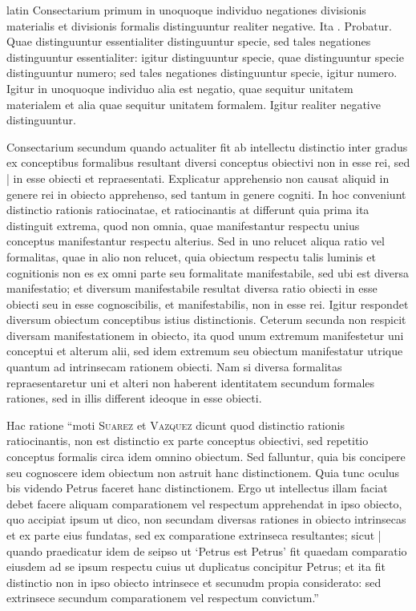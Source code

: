 \begin{otherlanguage*}{latin}
\pstart
 Consectarium primum in unoquoque individuo negationes divisionis materialis et divisionis formalis distinguuntur realiter negative. Ita . Probatur. Quae distinguuntur essentialiter distinguuntur specie, sed tales negationes distinguuntur essentialiter: igitur distinguuntur specie, quae distinguuntur specie distinguuntur numero; sed tales negationes distinguuntur specie, igitur numero. Igitur in unoquoque individuo alia est negatio, quae sequitur unitatem materialem et alia quae sequitur unitatem formalem. Igitur realiter negative distinguuntur. 
\pend

\pstart
 Consectarium secundum quando actualiter fit ab intellectu distinctio inter gradus ex conceptibus formalibus resultant diversi conceptus obiectivi non in esse rei, sed \textnormal{|}  in esse obiecti et repraesentati. Explicatur apprehensio non causat aliquid in genere rei in obiecto apprehenso, sed tantum in genere cogniti. In hoc conveniunt distinctio rationis ratiocinatae, et ratiocinantis at differunt quia prima ita distinguit extrema, quod non omnia, quae manifestantur respectu unius conceptus manifestantur respectu alterius. Sed in uno relucet aliqua ratio vel formalitas, quae in alio non relucet, quia obiectum respectu talis luminis et cognitionis non es ex omni parte seu formalitate manifestabile, sed ubi est diversa manifestatio; et diversum manifestabile resultat diversa ratio obiecti in esse obiecti seu in esse cognoscibilis, et manifestabilis, non in esse rei. Igitur respondet diversum obiectum conceptibus istius distinctionis. Ceterum secunda non respicit diversam manifestationem in obiecto, ita quod unum extremum manifestetur uni conceptui et alterum alii, sed idem extremum seu obiectum manifestatur utrique quantum ad intrinsecam rationem obiecti. Nam si diversa formalitas repraesentaretur uni et alteri non haberent identitatem secundum formales rationes, sed in illis different ideoque in esse obiecti. 
\pend

\pstart
 Hac ratione \enquote{moti \textsc{Suarez} et \textsc{Vazquez} dicunt quod distinctio rationis ratiocinantis, non est distinctio ex parte conceptus obiectivi, sed repetitio conceptus formalis circa idem omnino obiectum. Sed falluntur, quia bis concipere seu cognoscere idem obiectum non astruit hanc distinctionem. Quia tunc oculus bis videndo Petrus faceret hanc distinctionem. Ergo ut intellectus illam faciat debet facere aliquam comparationem vel respectum apprehendat in ipso obiecto, quo accipiat ipsum ut dico, non secundam diversas rationes in obiecto intrinsecas et ex parte eius fundatas, sed ex comparatione extrinseca resultantes; sicut \textnormal{|} quando praedicatur idem de seipso ut `Petrus est Petrus' fit quaedam comparatio eiusdem ad se ipsum respectu cuius ut duplicatus concipitur Petrus; et ita fit distinctio non in ipso obiecto intrinsece et secunudm propia considerato: sed extrinsece secundum comparationem vel respectum convictum.} 
\pend


\end{otherlanguage*}
